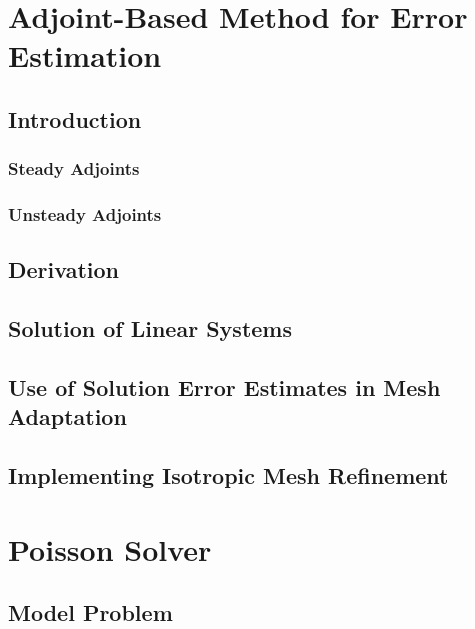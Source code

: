 \documentclass[titlepage,11pt,letterpaper]{article}
\begin{document}
\section{Adjoint-Based Method for Error Estimation}
\subsection{Introduction}
\subsubsection{Steady Adjoints}
\subsubsection{Unsteady Adjoints}
\subsection{Derivation}
\subsection{Solution of Linear Systems}
\subsection{Use of Solution Error Estimates in Mesh Adaptation}
\subsection{Implementing Isotropic Mesh Refinement}


\newpage
\section{Poisson Solver}
\subsection{Model Problem}


\newpage
\end{document}
